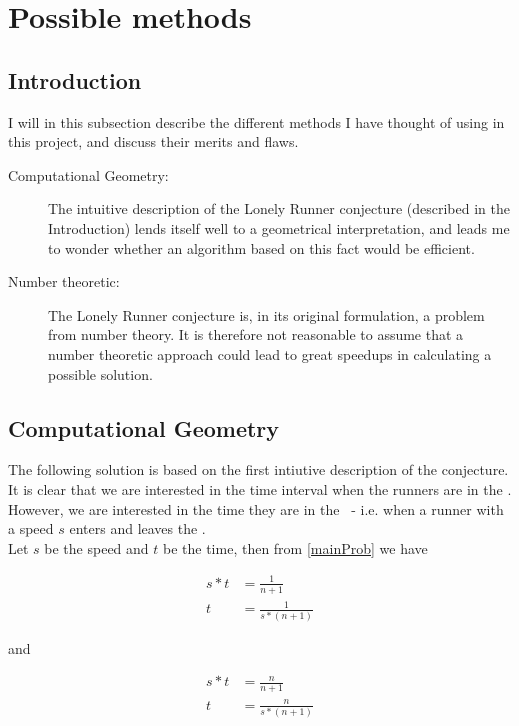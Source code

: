 \section{Possible methods}
\label{choiceOfMethod}

\subsection{Introduction}
I will in this subsection describe the different methods I have thought of using in this project, and discuss their merits and flaws.

\begin{description}
\item[Computational Geometry:] The intuitive description of the Lonely Runner conjecture (described in the Introduction) lends itself well to a geometrical interpretation, and leads me to wonder whether an algorithm based on this fact would be efficient.

\item[Number theoretic:] The Lonely Runner conjecture is, in its original formulation, a problem from number theory. It is therefore not reasonable to assume that a number theoretic approach could lead to great speedups in calculating a possible solution.
\end{description}

\subsection{Computational Geometry}

The following solution is based on the first intiutive description of the conjecture. It is clear that we are interested in the time interval when the runners are in the \zone. However, we are interested in the time they are in the \zone\, - i.e. when a runner with a speed $s$ enters and leaves the \zone.\\ 

Let $s$ be the speed and $t$ be the time, then from \ref{mainProb} we have 

\begin{equation}
\label{speedOne}
\begin{split}
s * t &= \frac{1}{n+1} \\
t &= \frac{1}{s * (n+1)}
\end{split}
\end{equation}

and 

\begin{equation}
\label{speedTwo}
\begin{split}
s * t &= \frac{n}{n+1} \\
t &= \frac{n}{s * (n+1)}
\end{split}
\end{equation}

